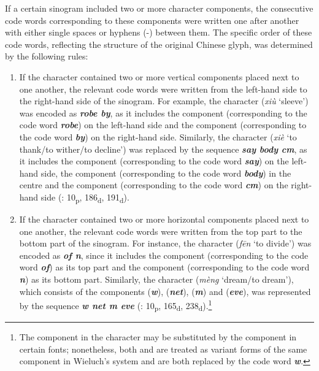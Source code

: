 \documentclass[output=paper,colorlinks,citecolor=brown,arabicfont,chinesefont]{langscibook}
\begin{document}
If a certain sinogram included two or more character components, the consecutive code words corresponding to these components were written one after another with either single spaces or hyphens (-) between them. The specific order of these code words, reflecting the structure of the original Chinese glyph, was determined by the following rules:

\largerpage[-1]
\begin{enumerate}
    \item If the character contained two or more vertical components placed next to one another, the relevant code words were written from the left-hand side to the right-hand side of the sinogram. For example, the character {} (\emph{xiù} ‘sleeve’) was encoded as \textbf{\emph{robe by}}, as it includes the component {} (corresponding to the code word \textbf{\emph{robe}}) on the left-hand side and the component {} (corresponding to the code word \textbf{\emph{by}}) on the right-hand side. Similarly, the character {} (\emph{xiè} ‘to thank/to wither/to decline’) was replaced by the sequence \textbf{\emph{say body cm}}, as it includes the component {} (corresponding to the code word \textbf{\emph{say}}) on the left-hand side, the component {} (corresponding to the code word \textbf{\emph{body}}) in the centre and the component {} (corresponding to the code word \textbf{\emph{cm}}) on the right-hand side (\citealt{Wieluch1936}: 10\textsubscript{p}, 186\textsubscript{d}, 191\textsubscript{d}).
    \item If the character contained two or more horizontal components placed next to one another, the relevant code words were written from the top part to the bottom part of the sinogram. For instance, the character {} (\emph{fēn} ‘to divide’) was encoded as \textbf{\emph{of n}}, since it includes the component {} (corresponding to the code word \textbf{\emph{of}}) as its top part and the component {} (corresponding to the code word \textbf{\emph{n}}) as its bottom part. Similarly, the character {} (\emph{mèng} ‘dream/to dream’), which consists of the components {} (\textbf{\emph{w}}), {} (\textbf{\emph{net}}), {} (\textbf{\emph{m}}) and {} (\textbf{\emph{eve}}), was represented by the sequence \textbf{\emph{w net m eve}} (\citealt{Wieluch1936}: 10\textsubscript{p}, 165\textsubscript{d}, 238\textsubscript{d}).\footnote{The component {} in the character {} may be substituted by the component {} in certain fonts; nonetheless, both {} and {} are treated as variant forms of the same component in Wieluch's system and are both replaced by the code word \textbf{\emph{w}}.}

\end{enumerate}
\end{document}
